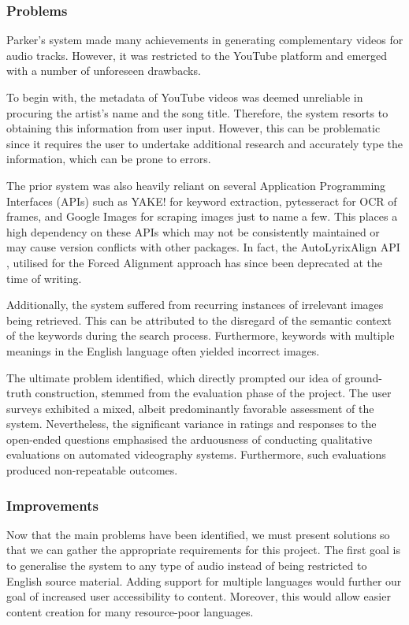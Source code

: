 \documentclass{l4proj}
\begin{document}
\subsubsection{Problems}
Parker's system made many achievements in generating complementary videos for audio tracks. However, it was restricted to the YouTube platform and emerged with a number of unforeseen drawbacks.

\label{par:metadata_problem}
To begin with, the metadata of YouTube videos was deemed unreliable in procuring the artist's name and the song title. Therefore, the system resorts to obtaining this information from user input. However, this can be problematic since it requires the user to undertake additional research and accurately type the information, which can be prone to errors. 

The prior system was also heavily reliant on several Application Programming Interfaces (APIs) such as YAKE! for keyword extraction, pytesseract \citep{pytesseract} for OCR of frames, and Google Images for scraping images just to name a few. This places a high dependency on these APIs which may not be consistently maintained or may cause version conflicts with other packages. In fact, the AutoLyrixAlign API \citep{gupta2020ala}, utilised for the Forced Alignment approach has since been deprecated at the time of writing.

Additionally, the system suffered from recurring instances of irrelevant images being retrieved. This can be attributed to the disregard of the semantic context of the keywords during the search process. Furthermore, keywords with multiple meanings in the English language often yielded incorrect images.

The ultimate problem identified, which directly prompted our idea of ground-truth construction, stemmed from the evaluation phase of the project. The user surveys exhibited a mixed, albeit predominantly favorable assessment of the system. Nevertheless, the significant variance in ratings and responses to the open-ended questions emphasised the arduousness of conducting qualitative evaluations on automated videography systems. Furthermore, such evaluations produced non-repeatable outcomes.

\subsubsection{Improvements}
Now that the main problems have been identified, we must present solutions so that we can gather the appropriate requirements for this project. The first goal is to generalise the system to any type of audio instead of being restricted to English source material. Adding support for multiple languages would further our goal of increased user accessibility to content. Moreover, this would allow easier content creation for many resource-poor languages.
\end{document}
